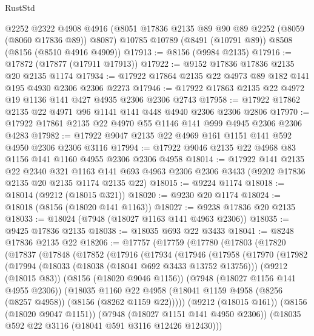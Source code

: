 \begin{lexlean}{RustStd}
\begin{coremodule}
{\begin{coremodule}
{{{{{{{{{{{{{{{{{{{{{{{{{{{{{{{{{{    @2252
    @2322
    @4908
    @4916
    (@8051 @17836 @2135 @89 @90 @89 @2252 (@8059 (@8060 @17836 @89)) @8087)
    @10785
    @10789
    (@8491 (@10791 @89))
    @8508
    (@8156 (@8510 @4916 @4909))
@17913 := @8156 (@9984 @2135)
@17916 := @17872 (@17877 (@17911 @17913))
@17922 := @9152 @17836 @17836 @2135 @20 @2135 @1174
@17934 := @17922 @17864 @2135 @22 @4973 @89 @182 @141 @195 @4930 @2306 @2306 @2273
@17946 := @17922 @17863 @2135 @22 @4972 @19 @1136 @141 @427 @4935 @2306 @2306 @2743
@17958 := @17922 @17862 @2135 @22 @4971 @96 @1141 @141 @448 @4940 @2306 @2306 @2806
@17970 := @17922 @17861 @2135 @22 @4970 @55 @1146 @141 @999 @4945 @2306 @2306 @4283
@17982 := @17922 @9047 @2135 @22 @4969 @161 @1151 @141 @592 @4950 @2306 @2306 @3116
@17994 := @17922 @9046 @2135 @22 @4968 @83 @1156 @141 @1160 @4955 @2306 @2306 @4958
@18014 := @17922
    @141
    @2135
    @22
    @2340
    @321
    @1163
    @141
    @693
    @4963
    @2306
    @2306
    @3433
    (@9202 @17836 @2135 @20 @2135 @1174 @2135 @22)
@18015 := @9224 @1174
@18018 := @18014 (@9212 (@18015 @321))
@18020 := @9230 @20 @1174
@18024 := @18018 (@8156 (@18020 @141 @1163))
@18027 := @9238 @17836 @20 @2135
@18033 := @18024 (@7948 (@18027 @1163 @141 @4963 @2306))
@18035 := @9425 @17836 @2135
@18038 := @18035 @693 @22 @3433
@18041 := @8248 @17836 @2135 @22
@18206 := @17757
    (@17759
      (@17780
        (@17803
          (@17820
            (@17837
              (@17848
                (@17852
                  (@17916
                    (@17934
                      (@17946
                        (@17958
                          (@17970
                            (@17982
                              (@17994
                                (@18033 (@18038 (@18041 @692 @3433 @13752 @13756)))
                                (@9212 (@18015 @83))
                                (@8156 (@18020 @9046 @1156))
                                (@7948 (@18027 @1156 @141 @4955 @2306))
                                (@18035
                                  @1160
                                  @22
                                  @4958
                                  (@18041
                                    @1159
                                    @4958
                                    (@8256 (@8257 @4958))
                                    (@8156 (@8262 @1159 @22)))))
                              (@9212 (@18015 @161))
                              (@8156 (@18020 @9047 @1151))
                              (@7948 (@18027 @1151 @141 @4950 @2306))
                              (@18035 @592 @22 @3116 (@18041 @591 @3116 @12426 @12430)))
}}}}}}}}}}}}}}}}}}}}}}}}}}}}}}}}}}
\end{coremodule}}
\end{coremodule}
\end{lexlean}

